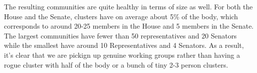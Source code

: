 The resulting communities are quite healthy in terms of size as well. For both the House and the Senate, clusters have on average about 5\% of the body, which corresponds to around 20-25 members in the House and 5 members in the Senate. The largest communities have fewer than 50 representatives and 20 Senators while the smallest have around 10 Representatives and 4 Senators. As a result, it's clear that we are pickign up genuine working groups rather than having a rogue cluster with half of the body or a bunch of tiny 2-3 person clusters.
